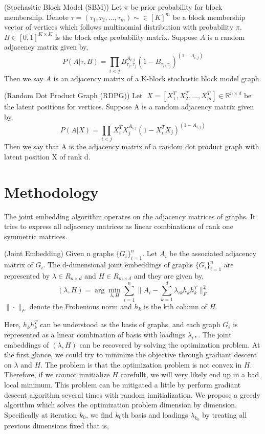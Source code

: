 \documentclass[a4paper]{article}
\newenvironment{definition}[1][Definition]{\begin{trivlist}
\item[\hskip \labelsep {\bfseries #1}]}{\end{trivlist}}
\begin{document}
\begin{definition} (Stochasitic Block Model (SBM)) Let $\pi$ be prior probability for block membership. Denote $\tau=(\tau_1,\tau_2,...,\tau_m) \sim \in [K]^m$ be a block membership vector of vertices which follows multinomial distribution with probability $\pi$. $B \in [0,1]^{K \times K}$ is the block edge probability matrix. Suppose $A$ is a random adjacency matrix given by,
\[ P(A|\tau,B)= \prod_{i<j} B_{\tau_i,\tau_j}^{A_{i,j}} (1-B_{\tau_i,\tau_j})^{(1-A_{i,j})}\] 
Then we say $A$ is an adjacency matrix of a K-block stochastic block model graph.
\end{definition}

\begin{definition} (Random Dot Product Graph (RDPG)) Let $X=[X_1^T, X_2^T,..., X_m^T] \in \mathbb{R}^{n \times d}$ be the latent positions for vertices. Suppose A is a random adjacency matrix given by,
\[ P(A|X)= \prod_{i<j} X_i^T X_j ^{A_{i,j}} (1-X_i^T X_j)^{(1-A_{i,j})}\]
Then we say that A is the adjacency matrix of a random dot product graph with latent position X
of rank d.
\end{definition}

\section{Methodology}

The joint embedding algorithm operates on the adjacency matrices of graphs. It tries to express all adjacency matrices as linear combinations of rank one symmetric matrices.   

\begin{definition} (Joint Embedding) Given n graphs $\{G_i \} _{i=1}^{n}$. Let $A_i$ be the associated adjacency matrix of $G_i$. The d-dimensional joint embeddings of graphs $\{G_i \} _{i=1}^{n}$ are represented by $\lambda \in R_{n \times d}$ and $H \in R _{m \times d}$ and they are given by,
\[ (\lambda,H) = \arg\min_{\lambda,H} \sum\limits_{i=1}^{n} \| A_i- \sum\limits_{k=1}^{d} \lambda_{ik} h_k h_k^T \| _F ^2 \] 
$\| \cdot \|_F$ denote the Frobenious norm and $h_k$ is the kth column of $H$.
\end{definition}

\noindent Here, $h_k h_k^T$ can be understood as the basis of graphs, and each graph $G_i$ is represented as a linear combination of basis with loadings $\lambda_{i*}$. The joint embeddings of $(\lambda,H)$ can be recovered by solving the optimization problem. At the first glance, we could try to minimize the objective through gradiant descent on $\lambda$ and $H$. The problem is that the optimization problem is not convex in $H$. Therefore, if we cannot innitialize $H$ carefullt, we will very likely end up in a bad local minimum. This problem can be mitigated a little by perform gradiant descent algorithm several times with random innitialization. We propose a greedy algorithm which solves the optimization problem dimension by dimension. Specifically at iteration $k_0$, we find $k_0$th basis and loadings $\lambda_{k_0}$ by treating all previous dimensions fixed that is,
\end{document}
